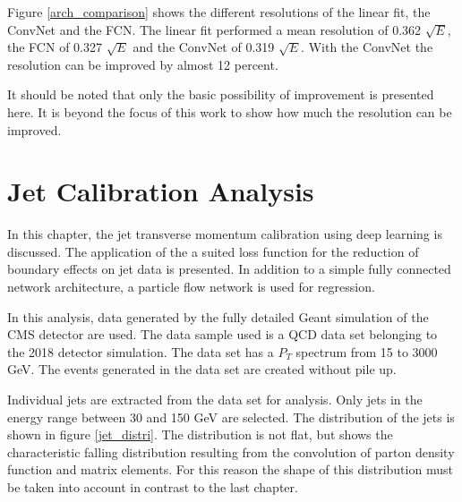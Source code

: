 \documentclass[12pt, a4paper]{thesis}
\begin{document}
Figure \ref{arch_comparison} shows the different resolutions of the
linear fit, the ConvNet and the FCN. The linear fit performed a mean
resolution of 0.362 $\sqrt{E}$, the FCN of 0.327 $\sqrt{E}$ and the
ConvNet of 0.319 $\sqrt{E}$. With the ConvNet the resolution can be
improved by almost 12 percent.

It should be noted that only the basic possibility of improvement is
presented here. It is beyond the focus of this work to show how much
the resolution can be improved.


\chapter{Jet Calibration Analysis}
\label{sec:org03a9b39}

In this chapter, the jet transverse momentum calibration using deep
learning is discussed. {The application of the a suited loss function
  for the reduction of boundary effects on jet data is presented.} In
addition to a simple fully connected network architecture, a particle
flow network is used for regression.

In this analysis, data generated by the fully detailed Geant
simulation of the CMS detector are used. The data sample used is a QCD
data set belonging to the 2018 detector simulation. The data set has a
\(P_T\) spectrum from 15 to 3000 GeV. The events generated in the data
set are created without pile up. 

Individual jets are extracted from the data set for analysis. Only
jets in the energy range between 30 and 150 GeV are selected. The
distribution of the jets is shown in figure \ref{jet_distri}. The
distribution is not flat, but shows the characteristic falling
distribution resulting from the convolution of parton density function
and matrix elements. For this reason the shape of this distribution
must be taken into account in contrast to the last chapter.
\end{document}
